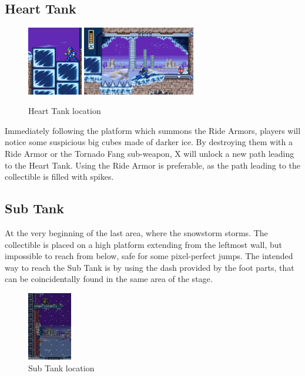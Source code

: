\subsection{Heart Tank}
\begin{figure}[htp]
	\centering
	\includegraphics[height=3cm]{figures/X3/Blizzard_buffalo/Heart_1.jpg}
	\includegraphics[height=3cm]{figures/X3/Blizzard_buffalo/Heart_2.jpg}
	\caption{Heart Tank location}
\end{figure}
Immediately following the platform which summons the Ride Armors, players will notice some suspicious big cubes made of darker ice. By destroying them with a Ride Armor or the Tornado Fang sub-weapon, X will unlock a new path leading to the Heart Tank. Using the Ride Armor is preferable, as the path leading to the collectible is filled with spikes.

\subsection{Sub Tank}
At the very beginning of the last area, where the snowstorm storms. The collectible is placed on a high platform extending from the leftmost wall, but impossible to reach from below, safe for some pixel-perfect jumps. The intended way to reach the Sub Tank is by using the dash provided by the foot parts, that can be  coincidentally found in the same area of the stage.

\begin{figure}[htp]
	\centering
	\includegraphics[height=3cm]{figures/X3/Blizzard_buffalo/Tank.jpg}
	\caption{Sub Tank location}
\end{figure}

